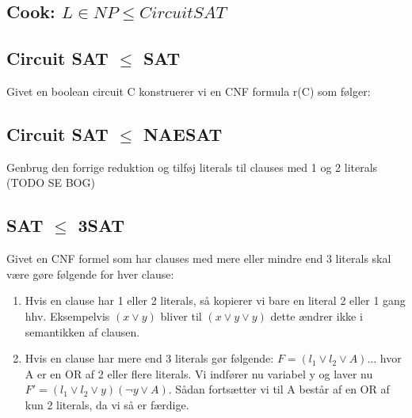 \documentclass{article}
\begin{document}
\subsection{Cook: $L \in NP \le Circuit SAT$}
\subsection{Circuit SAT $\le$ SAT}
Givet en boolean circuit C konstruerer vi en CNF formula r(C) som følger: 
\subsection{Circuit SAT $\le$ NAESAT}
Genbrug den forrige reduktion og tilføj literals til clauses med 1 og 2 literals (TODO SE BOG)
\subsection{SAT $\le$ 3SAT}
Givet en CNF formel som har clauses med mere eller mindre end 3 literals skal være gøre følgende for hver clause:\\
\begin{enumerate}
    \item Hvis en clause har 1 eller 2 literals, så kopierer vi bare en literal 2 eller 1 gang hhv. Eksempelvis $(x\lor y)$ bliver til $(x \lor y \lor y)$ dette ændrer ikke i semantikken af clausen.
    \item Hvis en clause har mere end 3 literals gør følgende: $ F = (l_1 \lor l_2 \lor A)...$ hvor A er en OR af 2 eller flere literals. Vi indfører nu variabel y og laver nu $F' = (l_1 \lor l_2 \lor y) (\lnot y \lor A)$. Sådan fortsætter vi til A består af en OR af kun  2 literals, da vi så er færdige.
    \end{enumerate}
\end{document}
